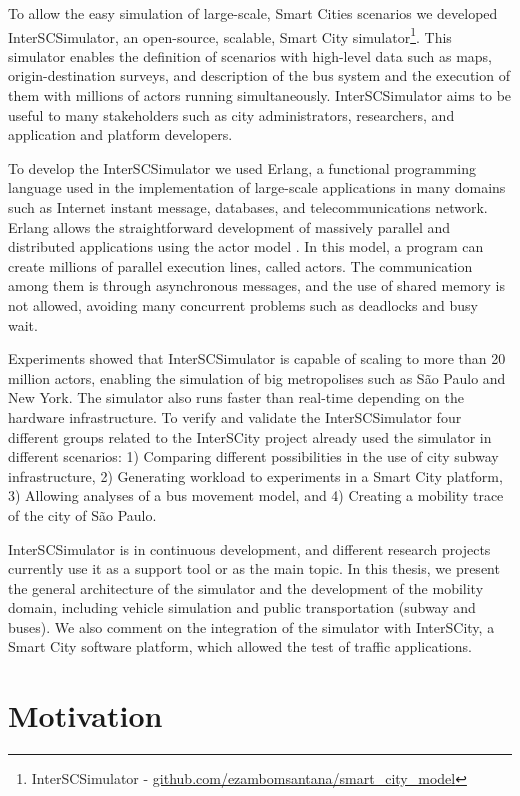 To allow the easy simulation of large-scale, Smart Cities scenarios we developed InterSCSimulator, an open-source, scalable, Smart City simulator\footnote{InterSCSimulator - \url{github.com/ezambomsantana/smart_city_model}}. This simulator enables the definition of scenarios with high-level data such as maps, origin-destination surveys, and description of the bus system and the execution of them with millions of actors running simultaneously. InterSCSimulator aims to be useful to many stakeholders such as city administrators, researchers, and application and platform developers.

To develop the InterSCSimulator we used Erlang, a functional programming language used in the implementation of large-scale applications in many domains such as Internet instant message, databases, and telecommunications network. Erlang allows the straightforward development of massively parallel and distributed applications using the actor model \citep{agha1985actors}. In this model, a program can create millions of parallel execution lines, called actors. The communication among them is through asynchronous messages, and the use of shared memory is not allowed, avoiding many concurrent problems such as deadlocks and busy wait.

Experiments showed that InterSCSimulator is capable of scaling to more than 20 million actors, enabling the simulation of big metropolises such as S\~ao Paulo and New York. The simulator also runs faster than real-time depending on the hardware infrastructure. To verify and validate the InterSCSimulator four different groups related to the InterSCity project already used the simulator in different scenarios: 1) Comparing different possibilities in the use of city subway infrastructure, 2) Generating workload to experiments in a Smart City platform, 3) Allowing analyses of a bus movement model, and 4) Creating a mobility trace of the city of S\~ao Paulo.

InterSCSimulator is in continuous development, and different research projects currently use it as a support tool or as the main topic. In this thesis, we present the general architecture of the simulator and the development of the mobility domain, including vehicle simulation and public transportation (subway and buses). We also comment on the integration of the simulator with InterSCity, a Smart City software platform, which allowed the test of traffic applications.

\section{Motivation}
\label{sec:contribucoes}

